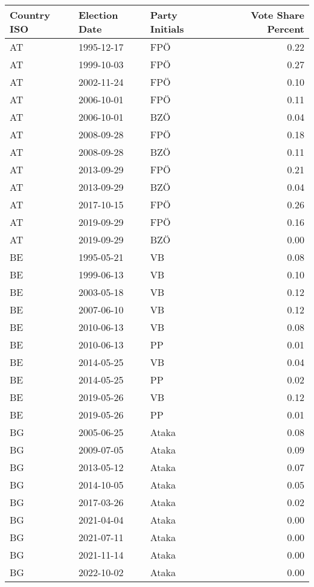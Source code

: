 \begin{longtable}{lllr}
  \hline
Country ISO & Election Date & Party Initials & Vote Share Percent \\ 
  \hline
AT & 1995-12-17 & FPÖ & 0.22 \\ 
  AT & 1999-10-03 & FPÖ & 0.27 \\ 
  AT & 2002-11-24 & FPÖ & 0.10 \\ 
  AT & 2006-10-01 & FPÖ & 0.11 \\ 
  AT & 2006-10-01 & BZÖ & 0.04 \\ 
  AT & 2008-09-28 & FPÖ & 0.18 \\ 
  AT & 2008-09-28 & BZÖ & 0.11 \\ 
  AT & 2013-09-29 & FPÖ & 0.21 \\ 
  AT & 2013-09-29 & BZÖ & 0.04 \\ 
  AT & 2017-10-15 & FPÖ & 0.26 \\ 
  AT & 2019-09-29 & FPÖ & 0.16 \\ 
  AT & 2019-09-29 & BZÖ & 0.00 \\ 
  BE & 1995-05-21 & VB & 0.08 \\ 
  BE & 1999-06-13 & VB & 0.10 \\ 
  BE & 2003-05-18 & VB & 0.12 \\ 
  BE & 2007-06-10 & VB & 0.12 \\ 
  BE & 2010-06-13 & VB & 0.08 \\ 
  BE & 2010-06-13 & PP & 0.01 \\ 
  BE & 2014-05-25 & VB & 0.04 \\ 
  BE & 2014-05-25 & PP & 0.02 \\ 
  BE & 2019-05-26 & VB & 0.12 \\ 
  BE & 2019-05-26 & PP & 0.01 \\ 
  BG & 2005-06-25 & Ataka & 0.08 \\ 
  BG & 2009-07-05 & Ataka & 0.09 \\ 
  BG & 2013-05-12 & Ataka & 0.07 \\ 
  BG & 2014-10-05 & Ataka & 0.05 \\ 
  BG & 2017-03-26 & Ataka & 0.02 \\ 
  BG & 2021-04-04 & Ataka & 0.00 \\ 
  BG & 2021-07-11 & Ataka & 0.00 \\ 
  BG & 2021-11-14 & Ataka & 0.00 \\ 
  BG & 2022-10-02 & Ataka & 0.00 \\ 

\end{longtable}

